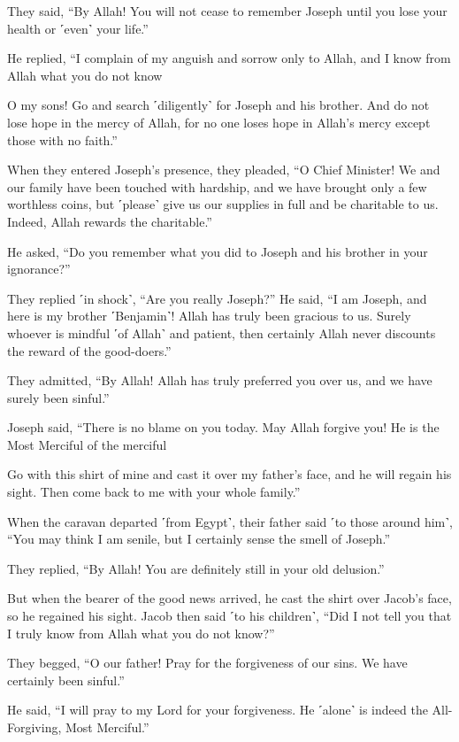 They said, “By Allah! You will not cease to remember Joseph until you lose your health or ˹even˺ your life.”

He replied, “I complain of my anguish and sorrow only to Allah, and I know from Allah what you do not know

O my sons! Go and search ˹diligently˺ for Joseph and his brother. And do not lose hope in the mercy of Allah, for no one loses hope in Allah’s mercy except those with no faith.”

When they entered Joseph’s presence, they pleaded, “O Chief Minister! We and our family have been touched with hardship, and we have brought only a few worthless coins, but ˹please˺ give us our supplies in full and be charitable to us. Indeed, Allah rewards the charitable.”

He asked, “Do you remember what you did to Joseph and his brother in your ignorance?”

They replied ˹in shock˺, “Are you really Joseph?” He said, “I am Joseph, and here is my brother ˹Benjamin˺! Allah has truly been gracious to us. Surely whoever is mindful ˹of Allah˺ and patient, then certainly Allah never discounts the reward of the good-doers.”

They admitted, “By Allah! Allah has truly preferred you over us, and we have surely been sinful.”

Joseph said, “There is no blame on you today. May Allah forgive you! He is the Most Merciful of the merciful

Go with this shirt of mine and cast it over my father’s face, and he will regain his sight. Then come back to me with your whole family.”

When the caravan departed ˹from Egypt˺, their father said ˹to those around him˺, “You may think I am senile, but I certainly sense the smell of Joseph.”

They replied, “By Allah! You are definitely still in your old delusion.”

But when the bearer of the good news arrived, he cast the shirt over Jacob’s face, so he regained his sight. Jacob then said ˹to his children˺, “Did I not tell you that I truly know from Allah what you do not know?”

They begged, “O our father! Pray for the forgiveness of our sins. We have certainly been sinful.”

He said, “I will pray to my Lord for your forgiveness. He ˹alone˺ is indeed the All-Forgiving, Most Merciful.”


